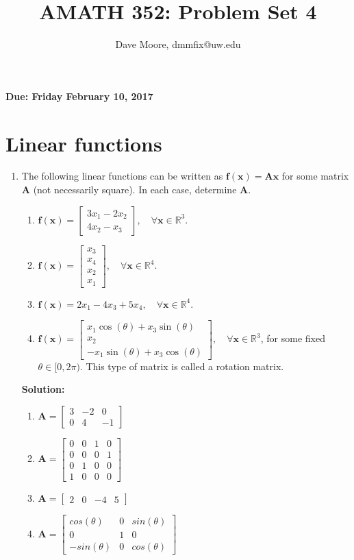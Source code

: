 \documentclass[]{article}
\title{AMATH 352: Problem Set 4}
\author{Dave Moore, dmmfix@uw.edu}
\newcommand{\R}{\mathbb{R}}				%
\newcommand{\bbm}{\begin{bmatrix}}		%
\newcommand{\ebm}{\end{bmatrix}}		%
\newcommand{\x}{\bm{x}}					%
\newcommand{\A}{\bm{A}}					%
\newcommand{\solution}{\vskip 0.5cm \textbf{\large Solution:} \\}
\begin{document}
\maketitle
    {\Large \textbf{Due: Friday February 10, 2017}} \\

    \vskip 1cm

    \section*{Linear functions}
    \begin{enumerate}
	\item The following linear functions can be written as $\bm{f}(\x)=\A\x$ for some matrix $\A$ (not necessarily square). In each case, determine $\A$.
	  \begin{enumerate}
	  \item $\bm{f}(\x) = \bbm 3x_1-2x_2\\4x_2-x_3 \ebm,\quad\forall\x\in\R^3$.
	  \item $\bm{f}(\x) = \bbm x_3\\x_4\\x_2\\x_1 \ebm,\quad\forall\x\in\R^4$.
	  \item $\bm{f}(\x) = 2x_1-4x_3+5x_4,\quad\forall\x\in\R^4$.
	  \item $\bm{f}(\x) = \bbm x_1\cos(\theta)+x_3\sin(\theta)\\x_2\\-x_1\sin(\theta)+x_3\cos(\theta) \ebm,\quad\forall\x\in\R^3$, for some fixed\\ $\theta\in[0,2\pi)$. This type of matrix is called a rotation matrix.
	  \end{enumerate}

	  \solution
	  \begin{enumerate}
	  \item $\bm{A} = \bbm 3 & -2 & 0 \\ 0 & 4 & -1 \ebm$
	  \item $\bm{A} = \bbm 0 & 0 & 1 & 0 \\ 0 & 0 & 0 & 1 \\ 0 & 1 & 0 & 0 \\ 1 & 0 & 0 & 0 \ebm$
	  \item $\bm{A} = \bbm 2 & 0 & -4 & 5 \ebm$
	  \item $\bm{A} = \bbm cos(\theta) & 0 & sin(\theta) \\ 0 & 1 & 0 \\ -sin(\theta) & 0 & cos(\theta) \ebm$
	  \end{enumerate}
    \end{enumerate}
\end{document}

